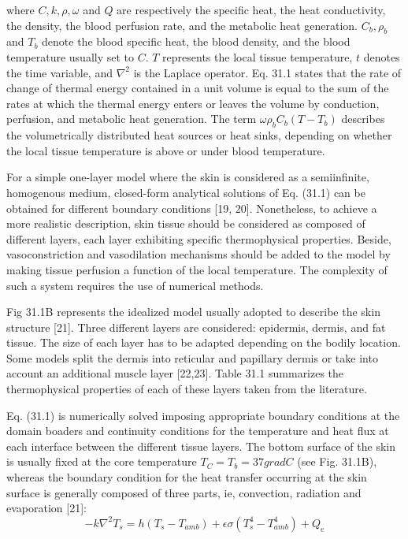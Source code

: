 where $C, k, \rho, \omega$ and $Q$ are respectively the specific heat, the heat
conductivity, the density, the blood perfusion rate, and the metabolic heat
generation. $C_b, \rho_b$ and $T_b$ denote the blood specific heat, the blood
density, and the blood temperature usually set to $C$. $T$ represents the local
tissue temperature, $t$ denotes the time variable, and $\nabla^2$ is the Laplace
operator. Eq. 31.1 states that the rate of change of thermal energy contained in
a unit volume is equal to the sum of the rates at which the thermal energy enters
or leaves the volume by conduction, perfusion, and metabolic heat generation. The
term $\omega \rho_b C_b \left ( T - T_b \right )$ describes the volumetrically
distributed heat sources or heat sinks, depending on whether the local tissue
temperature is above or under blood temperature.

For a simple one-layer model where the skin is considered as a semiinfinite,
homogenous medium, closed-form analytical solutions of Eq. (31.1) can be
obtained for different boundary conditions [19, 20]. Nonetheless, to achieve a
more realistic description, skin tissue should be considered as composed of
different layers, each layer exhibiting specific thermophysical properties.
Beside, vasoconstriction and vasodilation mechanisms should be added to the
model by making tissue perfusion a function of the local temperature. The
complexity of such a system requires the use of numerical methods.

Fig 31.1B represents the idealized model usually adopted to describe the skin
structure [21]. Three different layers are considered: epidermis, dermis, and
fat tissue. The size of each layer has to be adapted depending on the bodily
location. Some models split the dermis into reticular and papillary dermis or
take into account an additional muscle layer [22,23]. Table 31.1 summarizes
the thermophysical properties of each of these layers taken from the
literature.

Eq. (31.1) is numerically solved imposing appropriate boundary conditions at
the domain boaders and continuity conditions for the temperature and heat flux
at each interface between the different tissue layers. The bottom surface of
the skin is usually fixed at the core temperature $T_C = T_b = 37 grad C$
(see Fig. 31.1B), whereas the boundary condition for the heat transfer
occurring at the skin surface is generally composed of three parts, ie,
convection, radiation and evaporation [21]:
\begin{equation} 
	-k \nabla^2 T_s = h \left( T_s - T_{amb} \right) + \epsilon \sigma \left( T_{s}^4 - T_{amb}^4 \right) + Q_e
\end{equation}

